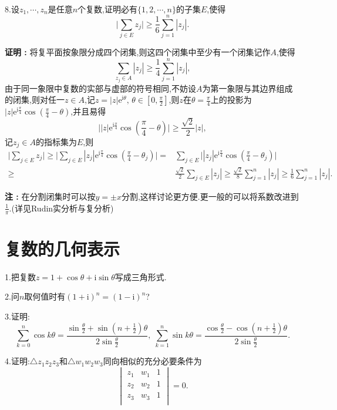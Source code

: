 \documentclass[12pt,fontset=none]{ctexbook}
\newenvironment{proof}[1][]{\par \noindent \textbf{\hspace{2em}证明 \vspace{0.1mm} #1 :}}{\par}
\renewcommand{\i}{\mathrm{i}}
\newcommand{\e}{\mathrm{e}}
\newenvironment{remark}[1][]{\par \noindent \textbf{\hspace{2em}注 \vspace{0.1mm} :}}{\par}
\begin{document}
\

8.设$z_{1},\cdots,z_{n}$是任意$n$个复数,证明必有$\{1,2,\cdots,n\}$的子集$E$,使得
$$\big|\sum\limits_{j \in E} z_{j}\big| \geqslant \frac{1}{6}\sum\limits_{j=1}^{n} |z_{j}| .$$
\begin{proof}
    将复平面按象限分成四个闭集,则这四个闭集中至少有一个闭集记作$A$,使得
    $$\sum\limits_{z_{j} \in A}|z_{j}| \geqslant \frac{1}{4}\sum\limits_{j=1}^{n}|z_{j}|,$$
    由于同一象限中复数的实部与虚部的符号相同,不妨设$A$为第一象限与其边界组成的闭集,则对任一$z \in A$,记$z=|z|\e^{{\i \theta}},\, \theta \in [0,\frac{\pi}{2}]$,则$z$在$\theta=\frac{\pi}{4}$上的投影为$|z|\e^{\i \frac{\pi}{4}}\cos(\frac{\pi}{4}-\theta)$,并且易得
    $$\big||z|\e^{\i \frac{\pi}{4}}\cos(\frac{\pi}{4}-\theta)\big| \geqslant \frac{\sqrt{2}}{2}|z|,$$
    记$z_{j} \in A$的指标集为$E$,则
    $$
    \begin{aligned}
      \big|\sum\limits_{j \in E} z_{j}\big|\geqslant \big|\sum\limits_{j \in E} |z_{j}|\e^{\i \frac{\pi}{4}}\cos(\frac{\pi}{4}-\theta_{j})\big|= & \sum\limits_{j \in E}\big||z_{j}|\e^{\i \frac{\pi}{4}}\cos(\frac{\pi}{4}-\theta_{j})\big| \\
      \geqslant & \frac{\sqrt{2}}{2}\sum\limits_{j \in E}|z_{j}| 
      \geqslant  \frac{\sqrt{2}}{8}\sum\limits_{j =1}^{n}|z_{j}| 
      \geqslant  \frac{1}{6}\sum\limits_{j =1}^{n}|z_{j}|.
    \end{aligned}
    $$
   
\end{proof}

\begin{remark}
    在分割闭集时可以按$y=\pm x$分割,这样讨论更方便.更一般的可以将系数改进到$\frac{1}{\pi}$.(详见Rudin实分析与复分析)
\end{remark}




\newpage
\section{复数的几何表示}
1.把复数$z=1+\cos \theta + \i \sin \theta$写成三角形式.


2.问$n$取何值时有$(1+\i)^{n}=(1-\i)^{n}$?


3.证明:
$$\sum\limits_{k=0}^{n}\cos k\theta=\frac{\sin \frac{\theta}{2}+\sin\left(n+\frac{1}{2}\right)\theta}{2\sin \frac{\theta}{2}},\;\sum\limits_{k=1}^{n}\sin k\theta=\frac{\cos \frac{\theta}{2}-\cos\left(n+\frac{1}{2}\right)\theta}{2\sin \frac{\theta}{2}}.$$

4.证明:$\bigtriangleup z_{1}z_{2}z_{3}$和$\bigtriangleup w_{1}w_{2}w_{3}$同向相似的充分必要条件为
$$
\begin{vmatrix}
  z_{1} & w_{1} & 1 \\
  z_{2} & w_{2} & 1 \\
  z_{3} & w_{3} & 1 \\
\end{vmatrix}=0.
$$
\end{document}
